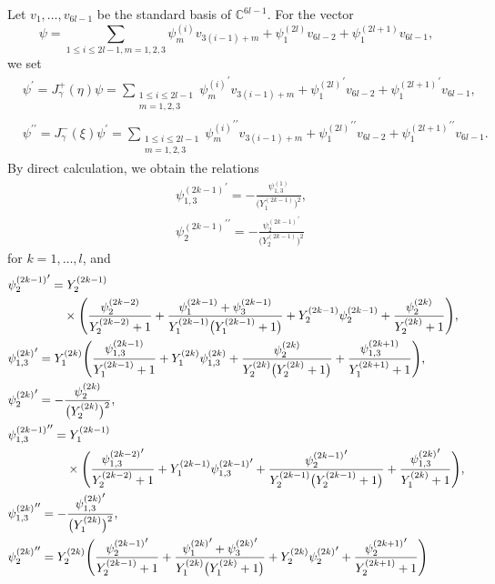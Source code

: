 \documentclass[pdftex]{sigma}
\numberwithin{equation}{section}
\newcommand{\C}{{\mathbb C}}
\begin{document}
Let $v_1,\dots,v_{6l-1}$ be the standard basis of $\C^{6l-1}$.
For the vector
	\[\psi=\sum_{1\leq i\leq 2l-1,m=1,2,3}\psi_m^{(i)}v_{3(i-1)+m}+\psi_1^{(2l)}v_{6l-2}+\psi_1^{(2l+1)}v_{6l-1},\]
we set
	\begin{align*}
	&\psi^\prime=J_\gamma^+(\eta)\psi=\sum_{\substack{1\leq i\leq 2l-1\\ m=1,2,3}}{\psi_m^{(i)}}^\prime v_{3(i-1)+m}+{\psi_1^{(2l)}}^\prime v_{6l-2}+{\psi_1^{(2l+1)}}^\prime v_{6l-1},\\
	&\psi^{\prime\prime}=J_\gamma^-(\xi)\psi^\prime=\sum_{\substack{1\leq i\leq 2l-1\\ m=1,2,3}}{\psi_m^{(i)}}^{\prime\prime} v_{3(i-1)+m}+{\psi_1^{(2l)}}^{\prime\prime} v_{6l-2}+{\psi_1^{(2l+1)}}^{\prime\prime} v_{6l-1}.
	\end{align*}
	By direct calculation, we obtain the relations
		\begin{align}
		\label{Cr1}&{\psi_{1,3}^{(2k-1)}}^\prime=-\frac{\psi_{1,3}^{(1)}}{\bigl(Y_1^{(2k-1)}\bigr)^2},\\
		\label{Crp2}&{\psi_2^{(2k-1)}}^{\prime\prime}=-\frac{{\psi_2^{(2k-1)}}^\prime}{\bigl(Y_2^{(2k-1)}\bigr)^2}
		\end{align}
	for $k=1,\dots,l$, and
		\begin{align} \label{Cr2}&{\psi_2^{(2k-1)}}^\prime=Y_2^{(2k-1)}\\
\nonumber&\hphantom{{\psi_2^{(2k-1)}}^\prime=}{}\times
\Biggl(\frac{\psi_2^{(2k-2)}}{Y_2^{(2k-2)}+1}+\frac{\psi_1^{(2k-1)}+\psi_3^{(2k-1)}}{Y_1^{(2k-1)}\bigl(Y_1^{(2k-1)}+1\bigr)} +Y_2^{(2k-1)}\psi_2^{(2k-1)}+\frac{\psi_2^{(2k)}}{Y_2^{(2k)}+1}\Biggr),\\
		\label{Cr3}&{\psi_{1,3}^{(2k)}}^\prime=Y_1^{(2k)}\Biggl(\frac{\psi_{1,3}^{(2k-1)}}{Y_1^{(2k-1)}+1}+Y_1^{(2k)}\psi_{1,3}^{(2k)}+\frac{\psi_2^{(2k)}}{Y_2^{(2k)}\bigl(Y_2^{(2k)}+1\bigr)} +\frac{\psi_{1,3}^{(2k+1)}}{Y_1^{(2k+1)}+1}\Biggr),\\
		\label{Cr4}&{\psi_2^{(2k)}}^\prime=-\frac{\psi_2^{(2k)}}{\bigl(Y_2^{(2k)}\bigr)^2},\\
		\label{Crp1}&{\psi_{1,3}^{(2k-1)}}^{\prime\prime}=Y_1^{(2k-1)}\\
\nonumber&\hphantom{{\psi_{1,3}^{(2k-1)}}^{\prime\prime}=}{}\times
\Biggl(\frac{{\psi_{1,3}^{(2k-2)}}^\prime}{Y_2^{(2k-2)}+1}+Y_1^{(2k-1)}{\psi_{1,3}^{(2k-1)}}^\prime +\frac{{\psi_2^{(2k-1)}}^\prime}{Y_2^{(2k-1)}\bigl(Y_2^{(2k-1)}+1\bigr)}+\frac{{\psi_{1,3}^{(2k)}}^\prime}{Y_1^{(2k)}+1}\Biggr),\\
		\label{Crp3}&{\psi_{1,3}^{(2k)}}^{\prime\prime}=-\frac{{\psi_{1,3}^{(2k)}}^\prime}{\bigl(Y_1^{(2k)}\bigr)^2},\\
		\label{Crp4}&{\psi_2^{(2k)}}^{\prime\prime}=Y_2^{(2k)}\Biggl(\frac{{\psi_2^{(2k-1)}}^\prime}{Y_2^{(2k-1)}+1}+\frac{{\psi_1^{(2k)}}^\prime +{\psi_3^{(2k)}}^\prime}{Y_1^{(2k)}\bigl(Y_1^{(2k)}+1\bigr)}+Y_2^{(2k)}{\psi_2^{(2k)}}^\prime+\frac{{\psi_2^{(2k+1)}}^\prime}{Y_2^{(2k+1)}+1}\Biggr)
		\end{align}
\end{document}

